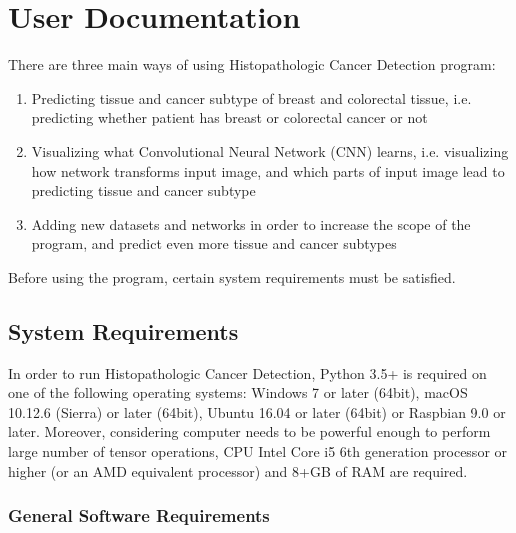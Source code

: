\chapter{User Documentation}
\label{ch:user}

There are three main ways of using Histopathologic Cancer Detection program:
\begin{enumerate}
	\itemsep 0em
	\item Predicting tissue and cancer subtype of breast and colorectal tissue, i.e. predicting whether patient has breast or colorectal cancer or not
	\item Visualizing what Convolutional Neural Network (CNN) learns, i.e. visualizing how network transforms input image, and which parts of input image lead to predicting tissue and cancer subtype
	\item Adding new datasets and networks in order to increase the scope of the program, and predict even more tissue and cancer subtypes
\end{enumerate}
Before using the program, certain system requirements must be satisfied.

\section{System Requirements}
\label{sysreq}

In order to run Histopathologic Cancer Detection, Python 3.5+ is required on one of the following operating systems: Windows 7 or later (64bit), macOS 10.12.6 (Sierra) or later (64bit), Ubuntu 16.04 or later (64bit) or Raspbian 9.0 or later. Moreover, considering computer needs to be powerful enough to perform large number of tensor operations, CPU Intel Core i5 6th generation processor or higher (or an AMD equivalent processor) and 8+GB of RAM are required.

\subsection{General Software Requirements}

